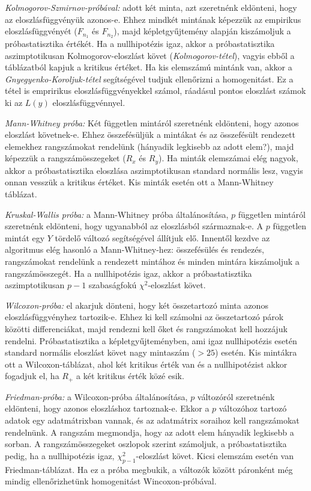 \emph{Kolmogorov-Szmirnov-próbával:} adott két minta, azt szeretnénk eldönteni, hogy az eloszlásfüggvényük azonos-e. Ehhez mindkét mintának képezzük az empirikus eloszlásfüggvényét ($F_{n_1}$ és $F_{n_2}$), majd képletgyűjtemény alapján kiszámoljuk a próbastatisztika értékét. Ha a nullhipotézis igaz, akkor a próbastatisztika aszimptotikusan Kolmogorov-eloszlást követ (\emph{Kolmogorov-tétel}), vagyis ebből a táblázatból kapjuk a kritikus értéket. Ha kis elemszámú mintánk van, akkor a \emph{Gnyegyenko-Koroljuk-tétel} segítségével tudjuk ellenőrizni a homogenitást. Ez a tétel is empririkus eloszlásfüggvényekkel számol, ráadásul pontos eloszlást számok ki az $L(y)$ eloszlásfüggvénnyel.

\pagebreak

\emph{Mann-Whitney próba:} Két független mintáról szeretnénk eldönteni, hogy azonos eloszlást követnek-e. Ehhez összefésüljük a mintákat és az összefésült rendezett elemekhez rangszámokat rendelünk (hányadik legkisebb az adott elem?), majd képezzük a rangszámösszegeket ($R_x$ és $R_y$). Ha minták elemszámai elég nagyok, akkor a próbastatisztika eloszlása aszimptotikusan standard normális lesz, vagyis onnan vesszük a kritikus értéket. Kis minták esetén ott a Mann-Whitney táblázat.

\emph{Kruskal-Wallis próba:} a Mann-Whitney próba általánosítása, $p$ független mintáról szeretnénk eldönteni, hogy ugyanabból az eloszlásból származnak-e. A $p$ független mintát egy $Y$ tördelő változó segítségével állítjuk elő. Innentől kezdve az algoritmus elég hasonló a Mann-Whitney-hez: összefésülés és rendezés, rangszámokat rendelünk a rendezett mintához és minden mintára kiszámoljuk a rangszámösszegét. Ha a nullhipotézis igaz, akkor a próbastatisztika aszimptotikusan $p-1$ szabaságfokú $\chi^2$-eloszlást követ.

\emph{Wilcoxon-próba:} el akarjuk dönteni, hogy két összetartozó minta azonos eloszlásfüggvényhez tartozik-e. Ehhez ki kell számolni az összetartozó párok közötti differenciákat, majd rendezni kell őket és rangszámokat kell hozzájuk rendelni. Próbastatisztika a képletgyűjteményben, ami igaz nullhipotézis esetén standard normális eloszlást követ nagy mintaszám ($>25$) esetén. Kis mintákra ott a Wilcoxon-táblázat, ahol két kritikus érték van és a nullhipotézist akkor fogadjuk el, ha $R_+$ a két kritikus érték közé esik.

\emph{Friedman-próba:} a Wilcoxon-próba általánosítása, $p$ változóról szeretnénk eldönteni, hogy azonos eloszláshoz tartoznak-e. Ekkor a $p$ változóhoz tartozó adatok egy adatmátrixban vannak, és az adatmátrix soraihoz kell rangszámokat rendelnünk. A rangszám megmondja, hogy az adott elem hányadik legkisebb a sorban. A rangszámösszegeket oszlopok szerint számoljuk, a próbastatisztika pedig, ha a nullhipotézis igaz, $\chi^2_{p-1}$-eloszlást követ. Kicsi elemszám esetén van Friedman-táblázat. Ha ez a próba megbukik, a változók között páronként még mindig ellenőrizhetünk homogenitást Wincoxon-próbával.




